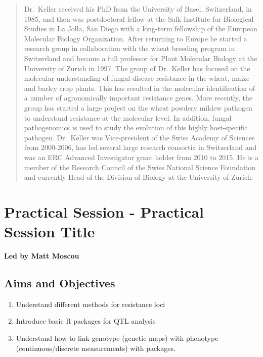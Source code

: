 \documentclass[12pt,]{book}
\providecommand{\tightlist}{%
  \setlength{\itemsep}{0pt}\setlength{\parskip}{0pt}}
\theoremstyle{definition}
\theoremstyle{definition}
\theoremstyle{remark}
\begin{document}
\begin{quote}
Dr.~Keller received his PhD from the University of Basel, Switzerland,
in 1985, and then was postdoctoral fellow at the Salk Institute for
Biological Studies in La Jolla, San Diego with a long-term fellowship of
the European Molecular Biology Organization. After returning to Europe
he started a research group in collaboration with the wheat breeding
program in Switzerland and became a full professor for Plant Molecular
Biology at the University of Zurich in 1997. The group of Dr.~Keller has
focused on the molecular understanding of fungal disease resistance in
the wheat, maize and barley crop plants. This has resulted in the
molecular identification of a number of agronomically important
resistance genes. More recently, the group has started a large project
on the wheat powdery mildew pathogen to understand resistance at the
molecular level. In addition, fungal pathogenomics is used to study the
evolution of this highly host-specific pathogen. Dr.~Keller was
Vice-president of the Swiss Academy of Sciences from 2000-2006, has led
several large research consortia in Switzerland and was an ERC Advanced
Investigator grant holder from 2010 to 2015. He is a member of the
Research Council of the Swiss National Science Foundation and currently
Head of the Division of Biology at the University of Zurich.
\end{quote}

\section*{Practical Session - Practical Session
Title}\label{practical-session---practical-session-title}

\textbf{Led by Matt Moscou}

\subsection*{Aims and Objectives}\label{aims-and-objectives-7}

\begin{enumerate}
\def\labelenumi{\arabic{enumi}.}
\tightlist
\item
  Understand different methods for resistance loci
\item
  Introduce basic R packages for QTL analysis
\item
  Understand how to link genotype (genetic maps) with phenotype
  (continuous/discrete measurements) with packages.
\end{enumerate}
\end{document}
